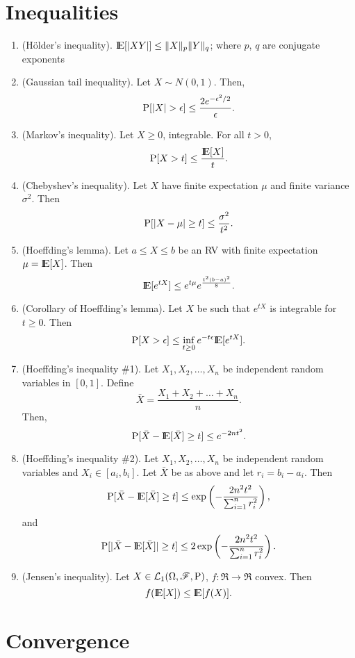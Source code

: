 \documentclass[a4paper,10pt]{article}
\begin{document}
\section{Inequalities}
\begin{enumerate}
 \item (H\"older's inequality). $\E[|XY|] \leq \|X\|_p \|Y\|_q $; where $p$, $q$ are conjugate exponents
 \item (Gaussian tail inequality). Let $X\sim N(0,1)$. Then,
 \[ 
  \prob[|X|>\epsilon] \leq \frac{2e^{-\epsilon^2/2}}{\epsilon}.
 \]
 \item (Markov's inequality). Let $X\geq 0$, integrable. For all $t>0$, 
 \[ 
 \prob[X>t]\leq \frac{\E[X]}{t}.
 \]
 \item (Chebyshev's inequality). Let $X$ have finite expectation $\mu$ and finite variance $\sigma^2$. Then
 \[
  \mathrm{P}[|X-\mu|\geq t] \leq \frac{\sigma^2}{t^2}.
 \]
\item (Hoeffding's lemma). Let $a\leq X\leq b$ be an RV with finite expectation $\mu=\E[X]$.
Then
\[
 \E[e^{tX}] \leq e^{t\mu}e^{\frac{t^2(b-a)^2}{8}}.
\]
\item (Corollary of Hoeffding's lemma). Let $X$ be such that $e^{tX}$ is integrable for $t\geq 0$. Then
\[
 \prob[X>\epsilon]\leq \inf_{t\geq 0}e^{-t\epsilon}\E[e^{tX}].
\]
\item (Hoeffding's inequality \#1). Let $X_1,X_2,\ldots, X_n$ be independent random variables in $[0,1]$. Define 
\[
 \bar{X} = \frac{X_1 + X_2 + \ldots + X_n}{n}.
\]
Then,
\[
 \prob[\bar{X} - \E[\bar{X}] \geq t] \leq e^{-2nt^2}.
\]
\item (Hoeffding's inequality \#2). Let $X_1,X_2,\ldots, X_n$ be independent random variables and $X_i\in [a_i, b_i]$.
Let $\bar{X}$ be as above and let $r_i = b_i - a_i$. Then
\[
 \prob[\bar{X} - \E[\bar{X}] \geq t] \leq \exp\left({-\frac{2n^2t^2}{\sum_{i=1}^{n} r_i^2}}\right),
\]
and
\[
 \prob[ |\bar{X} - \E[\bar{X}]| \geq t] \leq 2 \exp\left({-\frac{2n^2t^2}{\sum_{i=1}^{n} r_i^2}}\right).
\]
\item (Jensen's inequality). Let $X\in\mathcal{L}_1(\Omega,\mathscr{F},\mathrm{P})$, $f:\Re\to\Re$ convex. Then
\[
 f(\E[X])\leq \E[f(X)].
\]


\end{enumerate}

\section{Convergence}
\end{document}
